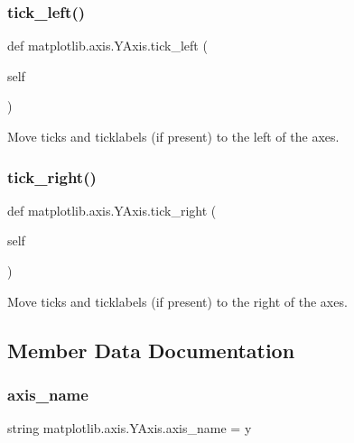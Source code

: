 \subsubsection{\texorpdfstring{tick\+\_\+left()}{tick\_left()}}
{\footnotesize\ttfamily def matplotlib.\+axis.\+Y\+Axis.\+tick\+\_\+left (\begin{DoxyParamCaption}\item[{}]{self }\end{DoxyParamCaption})}

\begin{DoxyVerb}Move ticks and ticklabels (if present) to the left of the axes.
\end{DoxyVerb}
 \mbox{\label{classmatplotlib_1_1axis_1_1YAxis_a080a80e97b2cbfc1db5bfa37f97220ce}} 
\subsubsection{\texorpdfstring{tick\+\_\+right()}{tick\_right()}}
{\footnotesize\ttfamily def matplotlib.\+axis.\+Y\+Axis.\+tick\+\_\+right (\begin{DoxyParamCaption}\item[{}]{self }\end{DoxyParamCaption})}

\begin{DoxyVerb}Move ticks and ticklabels (if present) to the right of the axes.
\end{DoxyVerb}
 

\subsection{Member Data Documentation}
\mbox{\label{classmatplotlib_1_1axis_1_1YAxis_a6d38e555a714ed3a7f0c135163e2b72b}} 
\subsubsection{\texorpdfstring{axis\+\_\+name}{axis\_name}}
{\footnotesize\ttfamily string matplotlib.\+axis.\+Y\+Axis.\+axis\+\_\+name = \textquotesingle{}y\textquotesingle{}\hspace{0.3cm}{\ttfamily [static]}}

